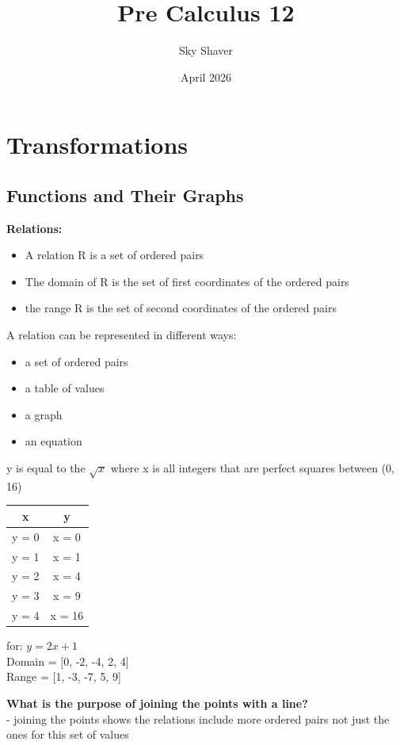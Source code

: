 \documentclass[10pt]{article}
\title{Pre Calculus 12}
\author{Sky Shaver}
\date{April 2026}
\begin{document}
\maketitle

\section{Transformations}


\subsection{Functions and Their Graphs}


\textbf{Relations:}
\begin{itemize}
    \item A relation R is a set of ordered pairs
    \item The domain of R is the set of first coordinates of the ordered pairs
    \item the range R is the set of second coordinates of the ordered pairs
\end{itemize}
A relation can be represented in different ways:
\begin{itemize}
    \item a set of ordered pairs
    \item a table of values
    \item a graph
    \item an equation
\end{itemize}


y is equal to the \(\sqrt{x}\) where x is all integers that are perfect squares between (0, 16) \\
\begin{tabular}{|c|c|}
    \hline
    x     & y      \\
    \hline
    y = 0 & x = 0  \\
    y = 1 & x = 1  \\
    y = 2 & x = 4  \\
    y = 3 & x = 9  \\
    y = 4 & x = 16 \\
    \hline
\end{tabular}


for: \(y = 2x + 1 \) \\
Domain = [0, -2, -4, 2, 4] \\
Range = [1, -3, -7, 5, 9]


\textbf{What is the purpose of joining the points with a line?} \\
- joining the points shows the relations include more ordered pairs not just the ones for this set of values
\end{document}
